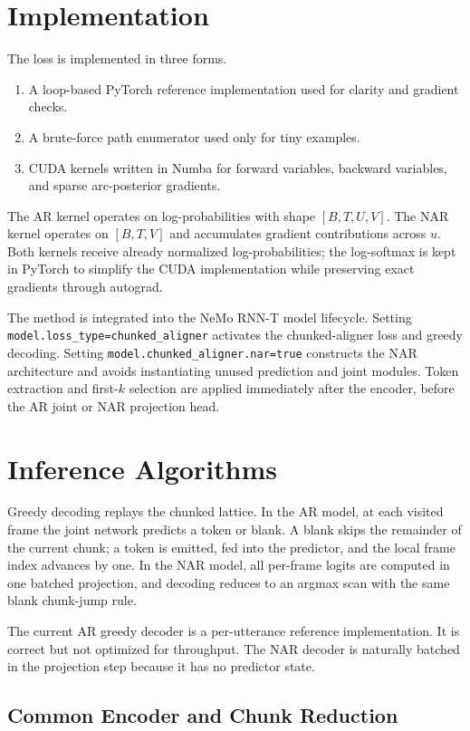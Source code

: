 \documentclass[conference]{IEEEtran}
\begin{document}
\section{Implementation}

The loss is implemented in three forms.
\begin{enumerate}
  \item A loop-based PyTorch reference implementation used for clarity and
  gradient checks.
  \item A brute-force path enumerator used only for tiny examples.
  \item CUDA kernels written in Numba for forward variables, backward variables,
  and sparse arc-posterior gradients.
\end{enumerate}
The AR kernel operates on log-probabilities with shape $[B,T,U,V]$. The NAR
kernel operates on $[B,T,V]$ and accumulates gradient contributions across $u$.
Both kernels receive already normalized log-probabilities; the log-softmax is
kept in PyTorch to simplify the CUDA implementation while preserving exact
gradients through autograd.

The method is integrated into the NeMo RNN-T model lifecycle. Setting
\texttt{model.loss\_type=chunked\_aligner} activates the chunked-aligner loss and
greedy decoding. Setting \texttt{model.chunked\_aligner.nar=true} constructs the
NAR architecture and avoids instantiating unused prediction and joint modules.
Token extraction and first-$k$ selection are applied immediately after the
encoder, before the AR joint or NAR projection head.

\section{Inference Algorithms}

Greedy decoding replays the chunked lattice. In the AR model, at each visited
frame the joint network predicts a token or blank. A blank skips the remainder of
the current chunk; a token is emitted, fed into the predictor, and the local frame
index advances by one. In the NAR model, all per-frame logits are computed in one
batched projection, and decoding reduces to an argmax scan with the same blank
chunk-jump rule.

The current AR greedy decoder is a per-utterance reference implementation. It is
correct but not optimized for throughput. The NAR decoder is naturally batched in
the projection step because it has no predictor state.

\subsection{Common Encoder and Chunk Reduction}
\end{document}

